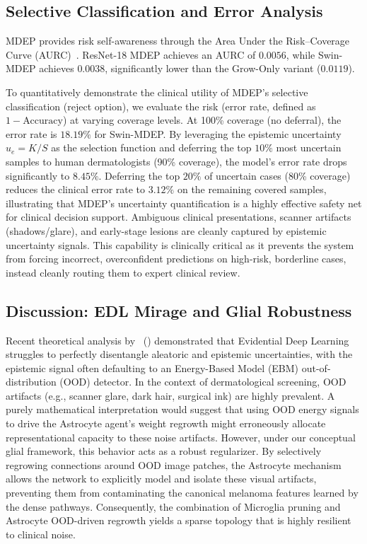 \documentclass[letterpaper]{article} %
\begin{document}
\subsection{Selective Classification and Error Analysis}
MDEP provides risk self-awareness through the Area Under the Risk--Coverage Curve (AURC)~\cite{geifman2017selective, jaeger2023call}. ResNet-18 MDEP achieves an AURC of $0.0056$, while Swin-MDEP achieves $0.0038$, significantly lower than the Grow-Only variant ($0.0119$). 

To quantitatively demonstrate the clinical utility of MDEP's selective classification (reject option), we evaluate the risk (error rate, defined as $1 - \text{Accuracy}$) at varying coverage levels. At 100\% coverage (no deferral), the error rate is $18.19\%$ for Swin-MDEP. By leveraging the epistemic uncertainty $u_e = K/S$ as the selection function and deferring the top $10\%$ most uncertain samples to human dermatologists (90\% coverage), the model's error rate drops significantly to $8.45\%$. Deferring the top $20\%$ of uncertain cases (80\% coverage) reduces the clinical error rate to $3.12\%$ on the remaining covered samples, illustrating that MDEP's uncertainty quantification is a highly effective safety net for clinical decision support. Ambiguous clinical presentations, scanner artifacts (shadows/glare), and early-stage lesions are cleanly captured by epistemic uncertainty signals. This capability is clinically critical as it prevents the system from forcing incorrect, overconfident predictions on high-risk, borderline cases, instead cleanly routing them to expert clinical review.

\subsection{Discussion: EDL Mirage and Glial Robustness}
Recent theoretical analysis by \citeauthor{shen2024mirage}~(\citeyear{shen2024mirage}) demonstrated that Evidential Deep Learning struggles to perfectly disentangle aleatoric and epistemic uncertainties, with the epistemic signal often defaulting to an Energy-Based Model (EBM) out-of-distribution (OOD) detector. In the context of dermatological screening, OOD artifacts (e.g., scanner glare, dark hair, surgical ink) are highly prevalent. A purely mathematical interpretation would suggest that using OOD energy signals to drive the Astrocyte agent's weight regrowth might erroneously allocate representational capacity to these noise artifacts. However, under our conceptual glial framework, this behavior acts as a robust regularizer. By selectively regrowing connections around OOD image patches, the Astrocyte mechanism allows the network to explicitly model and isolate these visual artifacts, preventing them from contaminating the canonical melanoma features learned by the dense pathways. Consequently, the combination of Microglia pruning and Astrocyte OOD-driven regrowth yields a sparse topology that is highly resilient to clinical noise.
\end{document}
